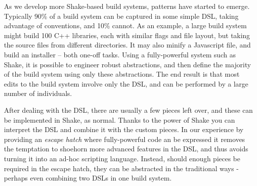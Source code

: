 
As we develop more Shake-based build systems, patterns have started to emerge. Typically 90\% of a build system can be captured in some simple DSL, taking advantage of conventions, and 10\% cannot. As an example, a large build system might build 100 C++ libraries, each with similar flags and file layout, but taking the source files from different directories. It may also minify a Javascript file, and build an installer -- both one-off tasks. Using a fully-powerful system such as Shake, it is possible to engineer robust abstractions, and then define the majority of the build system using only these abstractions. The end result is that most edits to the build system involve only the DSL, and can be performed by a large number of individuals.

After dealing with the DSL, there are usually a few pieces left over, and these can be implemented in Shake, as normal. Thanks to the power of Shake you can interpret the DSL and combine it with the custom pieces. In our experience by providing an \textit{escape hatch} where fully-powerful code an be expressed it removes the temptation to shoehorn more advanced features in the DSL, and thus avoids turning it into an ad-hoc scripting language. Instead, should enough pieces be required in the escape hatch, they can be abstracted in the traditional ways - perhaps even combining two DSLs in one build system.
